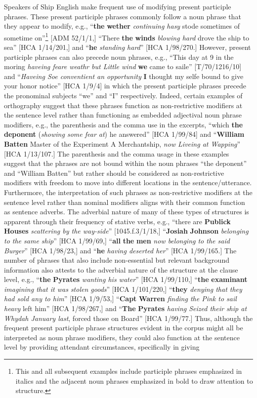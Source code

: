   Speakers of Ship English make frequent use of modifying present participle phrases. These present participle phrases commonly follow a noun phrase that they appear to modify, e.g., “\textbf{the} \textbf{wether} \textit{continuing hasy} stode sometimes of sometime on”\footnote{This and all subsequent examples include participle phrases emphasized in italics and the adjacent noun phrases emphasized in bold to draw attention to structure.} [ADM 52/1/1,] “There \textbf{the} \textbf{winds} \textit{blowing hard} drove the ship to sea” [HCA 1/14/201,] and “\textbf{he} \textit{standing hard}” [HCA 1/98/270.] However, present participle phrases can also precede noun phrases, e.g., “This day at 9 in the moring \textit{haveing feare weathr but Little wind} \textbf{we} came to saile” [T/70/1216/10] and “\textit{Haveing Soe conventient an opportunity} \textbf{I} thought my selfe bound to give your honor notice” [HCA 1/9/4] in which the present participle phrases precede the pronominal subjects “we” and “I” respectively. Indeed, certain examples of orthography suggest that these phrases function as non-restrictive modifiers at the sentence level rather than functioning as embedded adjectival noun phrase modifiers, e.g., the parenthesis and the comma use in the excerpts, “which \textbf{the} \textbf{deponent} (\textit{showing some fear at}) he answered” [HCA 1/99/84] and “\textbf{William} \textbf{Batten} Master of the Experiment A Merchantship, \textit{now Liveing at Wapping}” [HCA 1/13/107.] The parenthesis and the comma usage in these examples suggest that the phrases are not bound within the noun phrases “the deponent” and “William Batten” but rather should be considered as non-restrictive modifiers with freedom to move into different locations in the sentence/utterance. Furthermore, the interpretation of such phrases as non-restrictive modifiers at the sentence level rather than nominal modifiers aligns with their common function as sentence adverbs. The adverbial nature of many of these types of structures is apparent through their frequency of stative verbs, e.g., “there are \textbf{Publick} \textbf{Houses} \textit{scattering by the way-side}” [1045.f.3/1/18,] “\textbf{Josiah} \textbf{Johnson} \textit{belonging to the same ship}” [HCA 1/99/69,] “\textbf{all} \textbf{the} \textbf{men} \textit{now belonging to the said Burger}” [HCA 1/98/23,] and “\textbf{he} \textit{having deserted her}” [HCA 1/99/165.] The number of phrases that also include non-essential but relevant background information also attests to the adverbial nature of the structure at the clause level, e.g., “\textbf{the} \textbf{Pyrates} \textit{wanting his water}” [HCA 1/99/110,] “\textbf{the} \textbf{examinant} \textit{imagining that it was stolen goods}” [HCA 1/101/220,] “\textbf{they} \textit{denying that they had sold any to him}” [HCA 1/9/53,] “\textbf{Capt} \textbf{Warren} \textit{finding the Pink to sail heavy} left him” [HCA 1/98/267,] and “\textbf{The} \textbf{Pyrates} \textit{having Seized their ship at Whydah January last}, forced those on Board” [HCA 1/99/77.] Thus, although the frequent present participle phrase structures evident in the corpus might all be interpreted as noun phrase modifiers, they could also function at the sentence level by providing attendant circumstances, specifically in giving 